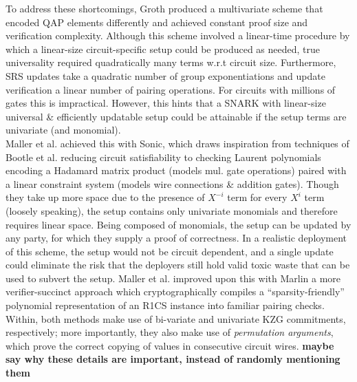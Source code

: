 \noindent To address these shortcomings, Groth \cite{grothupdatable} produced a multivariate scheme that encoded QAP elements differently and achieved constant proof size and verification complexity. Although this scheme involved a linear-time procedure by which a linear-size circuit-specific setup could be produced as needed, true universality required quadratically many terms w.r.t circuit size. Furthermore, SRS updates take a quadratic number of group exponentiations and update verification a linear number of pairing operations. For circuits with millions of gates this is impractical. However, this hints that a SNARK with linear-size universal \& efficiently updatable setup could be attainable if the setup terms are univariate (and monomial).\\

\noindent Maller et al. achieved this with Sonic, which draws inspiration from techniques of Bootle et al. \cite{bootlezkargs} reducing circuit satisfiability to checking Laurent polynomials encoding a Hadamard matrix product (models mul. gate operations) paired with a linear constraint system (models wire connections \& addition gates). Though they take up more space due to the presence of $X^{-i}$ term for every $X^i$ term (loosely speaking), the setup contains only univariate monomials and therefore requires linear space. Being composed of monomials, the setup can be updated by any party, for which they supply a proof of correctness. In a realistic deployment of this scheme, the setup would not be circuit dependent, and a single update could eliminate the risk that the deployers still hold valid toxic waste that can be used to subvert the setup. Maller et al. improved upon this with Marlin \cite{marlin} a more verifier-succinct approach which cryptographically compiles a ``sparsity-friendly'' polynomial representation of an R1CS instance into familiar pairing checks. Within, both methods make use of bi-variate and univariate KZG commitments, respectively; more importantly, they also make use of \textit{permutation arguments}, which prove the correct copying of values in consecutive circuit wires. \textbf{maybe say why these details are important, instead of randomly mentioning them}\\

